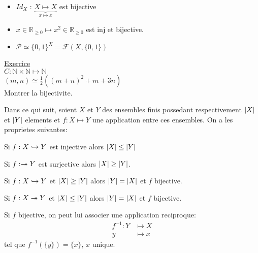 \documentclass[../main.tex]{subfiles}
\begin{document}
\begin{itemize}
	\item $Id_X$ : $\underbrace{ X \mapsto X }_{x \mapsto x}$ est bijective
	\item $x \in \mathbb{R}_{\geq 0} \mapsto x^{2} \in \mathbb{R}_{\geq 0}$ est inj et bijective.
	\item $ \mathcal{P} \simeq \{0,1\}^{X} = \mathcal{F} (X, \{0,1\})$
\end{itemize}
\underline{Exercice}\\
$C: \mathbb{N} \times \mathbb{N} \mapsto \mathbb{N}$\\
$ (m,n) \simeq \frac{1}{2}( ( m+n)^{2} + m +3n)$\\
Montrer la bijectivite.


Dans ce qui suit, soient $X$ et $Y$ des ensembles finis possedant respectivement $\left\vert X\right\vert$ et $\left\vert Y\right\vert$ elements et $f: X \mapsto Y$ une application entre ces ensembles. On a les proprietes suivantes:
\begin{propo}\label{propo:injectivite_et_cardinalite}
	Si $f: X \hookrightarrow Y$ est injective alors $ \left\vert X\right\vert \leq \left\vert Y\right\vert$
\end{propo}
\begin{propo}\label{propo:surjectivite_et_cardinalite}
	Si $f: \twoheadrightarrow Y$ est surjective alors $ \left\vert X\right\vert \geq \left\vert Y\right\vert$.
\end{propo}

\begin{propo}\label{propo:injectivite_et_condition}
	Si $f: X \hookrightarrow Y $ et $\left\vert X\right\vert \geq \left\vert Y\right\vert$ alors $\left\vert Y\right\vert = \left\vert X\right\vert$ et  $f$ bijective.
	
\end{propo}

\begin{propo}\label{propo:injectivite_et_condition}
	Si $f: X \twoheadrightarrow Y $ et $\left\vert X\right\vert \leq \left\vert Y\right\vert$ alors $\left\vert Y\right\vert = \left\vert X\right\vert$ et  $f$ bijective.
\end{propo}

\begin{propr}[Bijectivite]\label{propr:bijectivite}
Si $f$ bijective, on peut lui associer une application reciproque:
\begin{align*}
	f^{-1}: Y &\mapsto X\\
	y & \mapsto x
\end{align*}
tel que $f^{-1} ( \{y\}) = \{x\}$, $x$ unique.
\end{propr}
\end{document}
